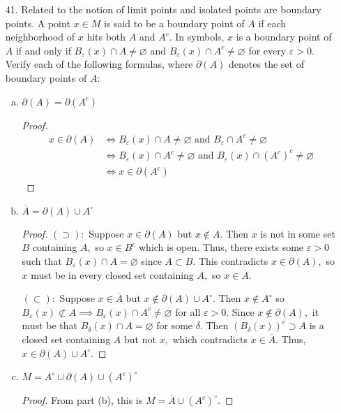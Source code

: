 \documentclass{article}
\begin{document}
\begin{itemize}
	\item[41.] Related to the notion of limit points and isolated points are boundary points. A point $x\in M$ is said to be a boundary point of $A$ if each neighborhood of $x$ hits both $A$ and $A^c.$ In symbols, $x$ is a boundary point of $A$ if and only if $B_\varepsilon(x)\cap A\neq\varnothing$ and $B_\varepsilon(x)\cap A^c\neq\varnothing$ for every $\varepsilon>0.$ Verify each of the following formulas, where $\partial(A)$ denotes the set of boundary points of $A:$
		\begin{enumerate}[(a)]
			\item $\partial(A)=\partial(A^c)$
				\begin{proof}
					\begin{align*}
						x\in \partial (A) &\iff B_{\varepsilon}(x)\cap A\neq\varnothing\text{ and } B_{\varepsilon}\cap A^c\neq \varnothing \\
						&\iff B_{\varepsilon} (x)\cap A^c\neq\varnothing\text{ and } B_{\varepsilon}(x)\cap (A^c)^c \neq \varnothing \\
						&\iff x\in \partial(A^c)
					\end{align*}
				\end{proof}

			\item $\overline{A}=\partial(A)\cup A^\circ$
				\begin{proof}
					$(\supset):$ Suppose $x\in\partial(A)$ but $x\notin A.$ Then $x$ is not in some set $B$ containing $A,$ so $x\in B^c$ which is open. Thus, there exists some $\varepsilon>0$ such that $B_{\varepsilon} (x)\cap A=\varnothing$ since $A\subset B.$ This contradicts $x\in \partial(A),$ so $x$ must be in every closed set containing $A,$ so $x\in\overline{A}.$

					$(\subset):$ Suppose $x\in \overline{A}$ but $x\notin \partial(A)\cup A^\circ.$ Then $x\notin A^\circ$ so $B_\varepsilon(x)\not\subset A\implies B_\varepsilon(x)\cap A^c\neq \varnothing$ for all $\varepsilon>0.$ Since $x\notin \partial(A),$ it must be that $B_\delta(x)\cap A=\varnothing$ for some $\delta.$ Then $(B_\delta(x))^c\supset A$ is a closed set containing $A$ but not $x,$ which contradicts $x\in \overline{A}.$ Thus, $x\in\partial(A)\cup A^\circ.$
				\end{proof}

			\item $M=A^\circ\cup \partial(A)\cup (A^c)^\circ$
				\begin{proof}
					From part (b), this is $M=\overline{A}\cup (A^c)^\circ.$


\end{proof}
\end{enumerate}
\end{itemize}
\end{document}
